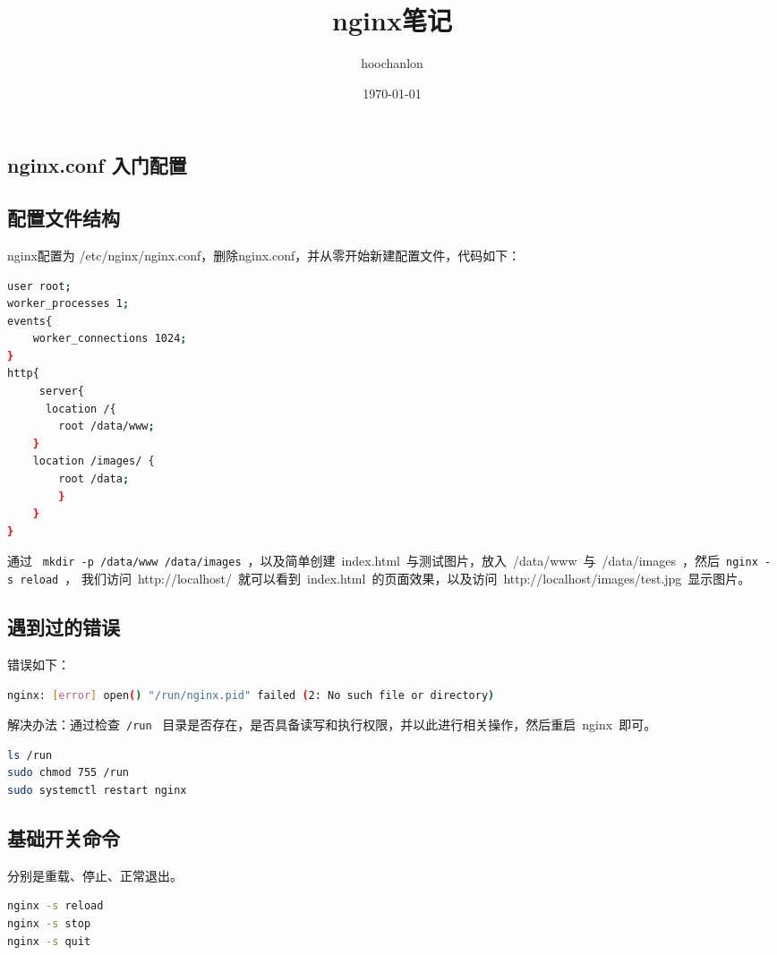 \documentclass[12pt, a4paper]{article} %
\title{nginx笔记}
\author{hoochanlon}
\date{\today}
\begin{document}
\begin{CJK*}{UTF8}{gbsn}
\maketitle

\clearpage
\section{nginx.conf 入门配置}
\subsection{配置文件结构}
nginx配置为 /etc/nginx/nginx.conf，删除nginx.conf，并从零开始新建配置文件，代码如下：

\begin{lstlisting}[language=bash]
user root;
worker_processes 1;
events{
    worker_connections 1024;
}
http{
     server{
      location /{
        root /data/www;
    }
    location /images/ {
        root /data;
        }
    }
}
\end{lstlisting}

通过~ \verb|mkdir -p /data/www /data/images|~，以及简单创建~index.html~与测试图片，放入~/data/www~与~/data/images~，然后~\verb|nginx -s reload|~，
我们访问~http://localhost/~就可以看到~index.html~的页面效果，以及访问~http://localhost/images/test.jpg~显示图片。

\subsection{遇到过的错误}

错误如下：
\begin{lstlisting}[language=bash]
nginx: [error] open() "/run/nginx.pid" failed (2: No such file or directory)
\end{lstlisting}
解决办法：通过检查~\verb|/run|~ 目录是否存在，是否具备读写和执行权限，并以此进行相关操作，然后重启~nginx~即可。
\begin{lstlisting}[language=bash]
ls /run
sudo chmod 755 /run
sudo systemctl restart nginx
\end{lstlisting}

\subsection{基础开关命令}

分别是重载、停止、正常退出。
\begin{lstlisting}[language=bash]
nginx -s reload
nginx -s stop
nginx -s quit
\end{lstlisting}


\end{CJK*}
\end{document}
